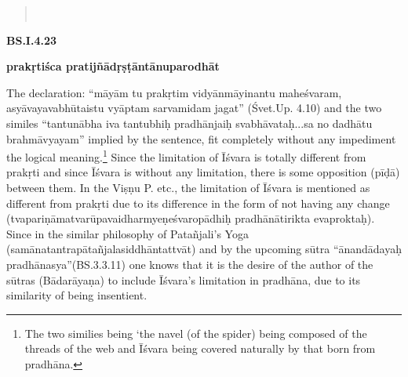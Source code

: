 \textbf{}

\begin{verse}
\\
\end{verse}



\textbf{BS.I.4.23}

\textbf{prakṛtiśca pratijñādṛṣṭāntānuparodhāt}

The  declaration: “māyām tu prakṛtim vidyānmāyinantu maheśvaram, asyāvayavabhūtaistu vyāptam sarvamidam jagat” (Śvet.Up. 4.10) and the two similes “tantunābha iva tantubhiḥ pradhānjaiḥ svabhāvataḥ...\-sa no dadhātu brahmāvyayam” implied by the sentence, fit completely without any impediment the logical meaning.\footnote{The two similies being ‘the navel (of the spider) being composed of the  threads  of the web and Īśvara being covered naturally by that born from pradhāna.} Since the limitation of Īśvara is totally different from prakṛti and since Īśvara is without any limitation, there is some opposition (pīḍā) between them. In the Viṣṇu P. etc., the limitation of Īśvara is mentioned as different from prakṛti due to its difference in the form of not having any change (tvapariṇāmatvarūpavaidharmyeṇeśvaropādhiḥ pradhānātirikta eva\break proktaḥ).  Since in the similar philosophy of Patañjali’s Yoga  (samānatantrapātañjalasiddhāntattvāt) and by the upcoming sūtra “ānandādayaḥ pradhānasya”(BS.3.3.11) one knows that it is the desire of the author of the sūtras (Bādarāyaṇa) to include Īśvara’s limitation in pradhāna, due to its similarity of being insentient.

